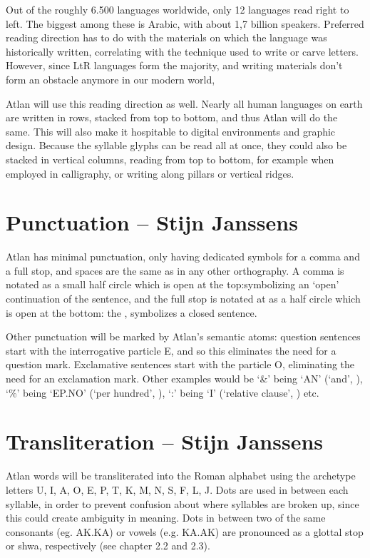 Out of the roughly 6.500 languages worldwide, only 12 languages read right to left. The biggest among these is Arabic, with about 1,7 billion speakers. Preferred reading direction has to do with the materials on which the language was historically written, correlating with the technique used to write or carve letters. However, since LtR languages form the majority, and writing materials don’t form an obstacle anymore in our modern world, 

Atlan will use this reading direction as well. Nearly all human languages on earth are written in rows, stacked from top to bottom, and thus Atlan will do the same. This will also make it hospitable to digital environments and graphic design. Because the syllable glyphs can be read all at once, they could also be stacked in vertical columns, reading from top to bottom, for example when employed in calligraphy, or writing along pillars or vertical ridges. 
\vfill

\section{Punctuation -- {\small Stijn Janssens}}
Atlan has minimal punctuation, only having dedicated symbols for a comma and a full stop, and spaces are the same as in any other orthography. A comma is notated as a small half circle which is open at the top:\comma symbolizing an ‘open’ continuation of the sentence, and the full stop is notated at as a half circle which is open at the bottom: the \period , symbolizes a closed sentence. 

Other punctuation will be marked by Atlan’s semantic atoms: question sentences start with the interrogative particle E, and so this eliminates the need for a question mark. Exclamative sentences start with the particle O, eliminating the need for an exclamation mark. Other examples would be ‘\&’ being ‘AN’ (‘and’, \an), ‘\%’ being ‘EP.NO’ (‘per hundred’, \ep\no), ‘:’ being ‘I’ (‘relative clause’, \Atlani) etc. 

\section{Transliteration -- {\small Stijn Janssens}}
Atlan words will be transliterated into the Roman alphabet using the archetype letters U, I, A, O, E, P, T, K, M, N, S, F, L, J. Dots are used in between each syllable, in order to prevent confusion about where syllables are broken up, since this could create ambiguity in meaning. Dots in between two of the same consonants (eg. AK.KA) or vowels (e.g. KA.AK) are pronounced as a glottal stop or shwa, respectively (see chapter 2.2 and 2.3). 

